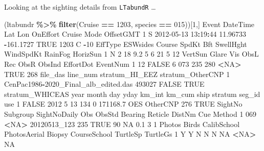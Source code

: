 \documentclass[
]{book}
\newenvironment{Shaded}{\begin{snugshade}}{\end{snugshade}}
\newcommand{\ConstantTok}[1]{\textcolor[rgb]{0.56,0.35,0.01}{#1}}
\newcommand{\DecValTok}[1]{\textcolor[rgb]{0.00,0.00,0.81}{#1}}
\newcommand{\FloatTok}[1]{\textcolor[rgb]{0.00,0.00,0.81}{#1}}
\newcommand{\FunctionTok}[1]{\textcolor[rgb]{0.13,0.29,0.53}{\textbf{#1}}}
\newcommand{\NormalTok}[1]{#1}
\newcommand{\SpecialCharTok}[1]{\textcolor[rgb]{0.81,0.36,0.00}{\textbf{#1}}}
\newcommand{\StringTok}[1]{\textcolor[rgb]{0.31,0.60,0.02}{#1}}
\begin{document}
Looking at the sighting details from \texttt{LTabundR} \ldots{}

\begin{Shaded}
\begin{Highlighting}[]
\NormalTok{(ltabundr }\SpecialCharTok{\%\textgreater{}\%} \FunctionTok{filter}\NormalTok{(Cruise }\SpecialCharTok{==} \DecValTok{1203}\NormalTok{, species }\SpecialCharTok{==} \StringTok{\textquotesingle{}015\textquotesingle{}}\NormalTok{))[}\DecValTok{1}\NormalTok{,]}
\NormalTok{  Event            DateTime      Lat       Lon OnEffort Cruise Mode OffsetGMT}
\DecValTok{1}\NormalTok{     S }\DecValTok{2012{-}05{-}13} \DecValTok{13}\SpecialCharTok{:}\DecValTok{19}\SpecialCharTok{:}\DecValTok{44} \FloatTok{11.96733} \SpecialCharTok{{-}}\FloatTok{161.1727}     \ConstantTok{TRUE}   \DecValTok{1203}\NormalTok{    C       }\SpecialCharTok{{-}}\DecValTok{10}
\NormalTok{  EffType ESWsides Course SpdKt Bft SwellHght WindSpdKt RainFog HorizSun}
\DecValTok{1}\NormalTok{       N        }\DecValTok{2}     \DecValTok{18}   \FloatTok{9.2}   \DecValTok{5}         \DecValTok{6}        \DecValTok{21}       \DecValTok{5}       \DecValTok{12}
\NormalTok{  VertSun Glare Vis ObsL Rec ObsR ObsInd EffortDot EventNum}
\DecValTok{1}      \DecValTok{12} \ConstantTok{FALSE}   \DecValTok{6}  \DecValTok{073} \DecValTok{235}  \DecValTok{280}   \SpecialCharTok{\textless{}}\ConstantTok{NA}\SpecialCharTok{\textgreater{}}      \ConstantTok{TRUE}      \DecValTok{268}
\NormalTok{                              file\_das line\_num stratum\_HI\_EEZ stratum\_OtherCNP}
\DecValTok{1}\NormalTok{ CenPac1986}\SpecialCharTok{{-}}\NormalTok{2020\_Final\_alb\_edited.das   }\DecValTok{493027}          \ConstantTok{FALSE}             \ConstantTok{TRUE}
\NormalTok{  stratum\_WHICEAS year month day yday km\_int   km\_cum ship  stratum seg\_id  use}
\DecValTok{1}           \ConstantTok{FALSE} \DecValTok{2012}     \DecValTok{5}  \DecValTok{13}  \DecValTok{134}      \DecValTok{0} \FloatTok{171168.7}\NormalTok{  OES OtherCNP    }\DecValTok{276} \ConstantTok{TRUE}
\NormalTok{  SightNo Subgroup SightNoDaily Obs ObsStd Bearing Reticle DistNm Cue Method}
\DecValTok{1}     \DecValTok{069}     \SpecialCharTok{\textless{}}\ConstantTok{NA}\SpecialCharTok{\textgreater{}}\NormalTok{ 20120513\_123 }\DecValTok{235}   \ConstantTok{TRUE}      \DecValTok{90}      \ConstantTok{NA}    \FloatTok{0.1}   \DecValTok{3}      \DecValTok{1}
\NormalTok{  Photos Birds CalibSchool PhotosAerial Biopsy CourseSchool TurtleSp TurtleGs}
\DecValTok{1}\NormalTok{      Y     Y           N            N      N           }\ConstantTok{NA}     \SpecialCharTok{\textless{}}\ConstantTok{NA}\SpecialCharTok{\textgreater{}}       \ConstantTok{NA}

\end{Highlighting}
\end{Shaded}
\end{document}

